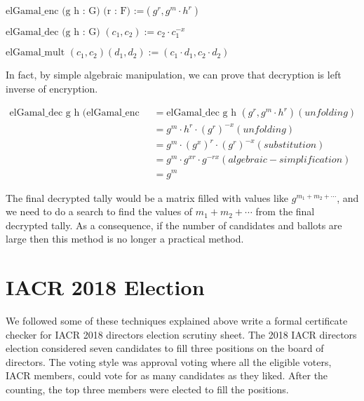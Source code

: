 \begin{displayquote}
$\text{elGamal\_enc (g h : G) (r : F) :=} (g^r, g^m \cdot h^r)$

$\text{elGamal\_dec (g h : G) }  (c_{1}, c_{2}) := c_{2} \cdot c_{1}^{-x}$

$\text{elGamal\_mult } (c_{1}, c_{2}) (d_{1}, d_{2}) := (c_{1} \cdot d_{1}, c_{2} \cdot d_{2})$

\end{displayquote}

\noindent
In fact, by simple algebraic manipulation, we can prove that 
decryption is left inverse of encryption. 


\begin{align}
  \text{elGamal\_dec g h (elGamal\_enc g h r)} &= \text{elGamal\_dec g h } (g^r, g^m \cdot h^r)  (unfolding) \nonumber \\
                     &= g^m \cdot h^r \cdot (g^r)^{-x}  (unfolding) \nonumber \\
                     &= g^m \cdot (g^x)^r \cdot (g^r)^{-x} (substitution) \nonumber \\
                     &=  g^m \cdot g^{xr} \cdot g^{-rx} (algebraic-simplification)\nonumber \\
                     &= g^m\nonumber 
\end{align}


\noindent 
The final decrypted tally would be a matrix filled with values like $g^{m_{1} + m_{2} + \cdots }$, and we 
need to do a search to find the values of $m_{1} + m_{2} + \cdots$ from the 
final decrypted tally. As a consequence, if the number of candidates and ballots are large then 
this method is no longer a practical method. 

\section{IACR 2018 Election}
\label{sec:election_iacr}
We followed some of these techniques explained above write a formal 
certificate checker for  IACR 2018 directors election scrutiny sheet.  
The 2018  IACR directors election considered seven 
 candidates to fill three positions on the board of directors.   The voting 
 style was approval voting where all the eligible voters, IACR members, 
 could vote for as many candidates as they liked. After the counting, 
 the top three members were elected to fill the positions. 
 
